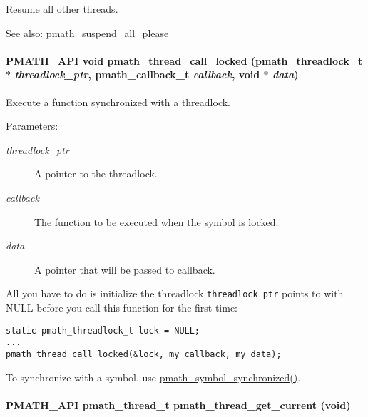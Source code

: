 Resume all other threads. 

\begin{Desc}
\item[See also:]\hyperlink{group__threads_g688141bacfb504b83dc319695f243b95}{pmath\_\-suspend\_\-all\_\-please} \end{Desc}
\hypertarget{group__threads_gfcbd1d376791cb95a78e102366b7b79a}{
\paragraph[{pmath\_\-thread\_\-call\_\-locked}]{\setlength{\rightskip}{0pt plus 5cm}PMATH\_\-API void pmath\_\-thread\_\-call\_\-locked ({\bf pmath\_\-threadlock\_\-t} $\ast$ {\em threadlock\_\-ptr}, \/  {\bf pmath\_\-callback\_\-t} {\em callback}, \/  void $\ast$ {\em data})}\hfill}
\label{group__threads_gfcbd1d376791cb95a78e102366b7b79a}


Execute a function synchronized with a threadlock. 

\begin{Desc}
\item[Parameters:]
\begin{description}
\item[{\em threadlock\_\-ptr}]A pointer to the threadlock. \item[{\em callback}]The function to be executed when the symbol is locked. \item[{\em data}]A pointer that will be passed to callback.\end{description}
\end{Desc}
All you have to do is initialize the threadlock {\tt threadlock\_\-ptr} points to with NULL before you call this function for the first time: 

\begin{Code}\begin{verbatim}static pmath_threadlock_t lock = NULL;
...
pmath_thread_call_locked(&lock, my_callback, my_data);
\end{verbatim}
\end{Code}



To synchronize with a symbol, use \hyperlink{group__symbols_g95b141d9cb33fba80d6a807f304ee3b7}{pmath\_\-symbol\_\-synchronized()}. \hypertarget{group__threads_g908b6ee94115539a20530cfb051dc52c}{
\paragraph[{pmath\_\-thread\_\-get\_\-current}]{\setlength{\rightskip}{0pt plus 5cm}PMATH\_\-API {\bf pmath\_\-thread\_\-t} pmath\_\-thread\_\-get\_\-current (void)}\hfill}
\label{group__threads_g908b6ee94115539a20530cfb051dc52c}


